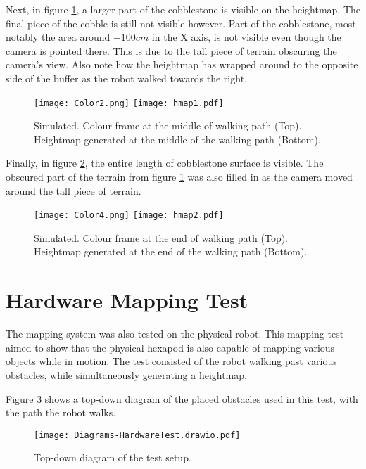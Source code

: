         \noindent
        Next, in figure \ref{fig:sim_hmap_middle}, a larger part of the cobblestone is visible on the heightmap. The final piece of the cobble is still not visible however. Part of the cobblestone, most notably the area around \(-100cm\) in the X axis, is not visible even though the camera is pointed there. This is due to the tall piece of terrain obscuring the camera's view. Also note how the heightmap has wrapped around to the opposite side of the buffer as the robot walked towards the right.
        \begin{figure}[h]
            \centering
            \texttt{[image: Color2.png]}
            \texttt{[image: hmap1.pdf]}
            \caption{Simulated. Colour frame at the middle of walking path (Top). Heightmap generated at the middle of the walking path (Bottom).}
            \label{fig:sim_hmap_middle}
        \end{figure}
        
        \newpage
        \noindent
        Finally, in figure \ref{fig:sim_hmap_end}, the entire length of cobblestone surface is visible. The obscured part of the terrain from figure \ref{fig:sim_hmap_middle} was also filled in as the camera moved around the tall piece of terrain.
        \begin{figure}[h]
            \centering
            \texttt{[image: Color4.png]}
            \texttt{[image: hmap2.pdf]}
            \caption{Simulated. Colour frame at the end of walking path (Top). Heightmap generated at the end of the walking path (Bottom).}
            \label{fig:sim_hmap_end}
        \end{figure}


    \newpage
    \section{Hardware Mapping Test}\label{sec:hardware_hmap}
        The mapping system was also tested on the physical robot. This mapping test aimed to show that the physical hexapod is also capable of mapping various objects while in motion. The test consisted of the robot walking past various obstacles, while simultaneously generating a heightmap.

        Figure \ref{fig:hardware_map_diag} shows a top-down diagram of the placed obstacles used in this test, with the path the robot walks.
        \begin{figure}[h]
            \centering
            \texttt{[image: Diagrams-HardwareTest.drawio.pdf]}
            \caption{Top-down diagram of the test setup.}
            \label{fig:hardware_map_diag}
        \end{figure}

